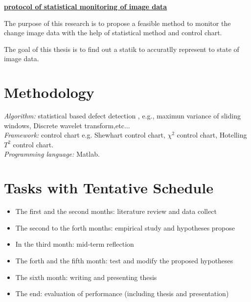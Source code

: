 \thispagestyle{empty}
\underline{\large{\textbf{protocol of statistical monitoring of image data}}}

\vspace{1cm}
The purpose of this research is to propose a feasible method to monitor the change image data with the help of statistical method and control chart. 

The goal of this thesis is to find out a statik to accuratlly represent to state of image data.



\section*{Methodology}
\textit{Algorithm:} statistical based defect detection , e.g., maximun variance of sliding windows, Discrete wavelet transform,etc... \\
\textit{Framework:} control chart e.g. Shewhart control chart, $\chi^{2}$ control chart, Hotelling $T^{2}$ control chart.   \\
\textit{Programming language:} Matlab.


\section*{Tasks with Tentative Schedule}
\begin{itemize}
    \item The first and the second months: literature review and data collect
    \item The second to the forth months: empirical study and hypotheses propose
    \item In the third month: mid-term reflection
    \item The forth and the fifth month: test and modify the proposed hypotheses
    \item The sixth month: writing and presenting thesis
    \item The end: evaluation of performance (including thesis and presentation)
\end{itemize}


